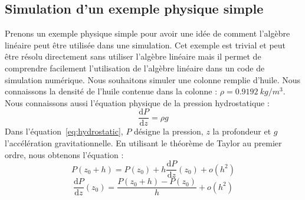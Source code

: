 \subsection{Simulation d'un exemple physique simple}
Prenons un exemple physique simple pour avoir une idée de comment l'algèbre linéaire peut être utilisée dans une simulation.
%
Cet exemple est trivial et peut être résolu directement sans utiliser l'algèbre linéaire mais il permet de comprendre facilement l'utilisation de l'algèbre linéaire dans un code de simulation numérique.
%
Nous souhaitons simuler une colonne remplie d'huile.
%
Nous connaissons la densité de l'huile contenue dans la colonne : $\rho = 0.9192~kg/m^3$.
%
Nous connaissons aussi l'équation physique de la pression hydrostatique :
%
\begin{equation}
\label{eq:hydrostatic}
\frac{\mathrm d P}{\mathrm d z} = \rho{}g
\end{equation}
%
Dans l'équation~\eqref{eq:hydrostatic}, $P$ désigne la pression, $z$ la profondeur et $g$ l'accélération gravitationnelle.
%
En utilisant le théorème de Taylor au premier ordre, nous obtenons l'équation :
%
\begin{equation}
P(z_0+h) = P(z_0) + h \frac{\mathrm d P}{\mathrm d z} (z_0) + o(h^2)
\end{equation}
\begin{equation}
\frac{\mathrm d P}{\mathrm d z} (z_0) = \frac{P(z_0+h) - P(z_0)}{h} + o(h^2)
\end{equation}

